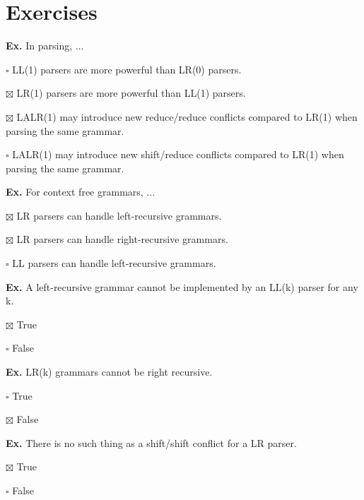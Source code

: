 \section*{Exercises}

\hrulefill

\textbf{Ex.} In parsing, ...
\begin{compactitem}[$\quad\bullet$]
	\item[$\square$] LL(1) parsers are more powerful than LR(0) parsers.
	\item[$\boxtimes$] LR(1) parsers are more powerful than LL(1) parsers.
	\item[$\boxtimes$] LALR(1) may introduce new reduce/reduce conflicts compared to LR(1) when parsing the same grammar.
	\item[$\square$] LALR(1) may introduce new shift/reduce conflicts compared to LR(1) when parsing the same grammar.
\end{compactitem}

\hrulefill

\textbf{Ex.} For context free grammars, ...
\begin{compactitem}[$\quad\bullet$]
	\item[$\boxtimes$] LR parsers can handle left-recursive grammars.
	\item[$\boxtimes$] LR parsers can handle right-recursive grammars.
	\item[$\square$] LL parsers can handle left-recursive grammars.
\end{compactitem}

\hrulefill

\textbf{Ex.} A left-recursive grammar cannot be implemented by an LL(k) parser for any k.
\begin{compactitem}[$\quad\bullet$]
	\item[$\boxtimes$] True
	\item[$\square$] False
\end{compactitem}

\hrulefill

\textbf{Ex.} LR(k) grammars cannot be right recursive.
\begin{compactitem}[$\quad\bullet$]
	\item[$\square$] True
	\item[$\boxtimes$] False
\end{compactitem}

\hrulefill

\textbf{Ex.} There is no such thing as a shift/shift conflict for a LR parser.
\begin{compactitem}[$\quad\bullet$]
	\item[$\boxtimes$] True
	\item[$\square$] False
\end{compactitem}

